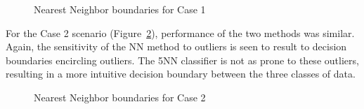 \documentclass[article, 1.5space, letterpaper, 12pt, oneside, header, footer]{SydeClass}
\begin{document}
\begin{figure}[ht]
\centering
	
	\caption{Nearest Neighbor boundaries for Case 1}
	\label{fig:nn_boundary_case1}
\end{figure}

For the Case 2 scenario (Figure~\ref{fig:nn_boundary_case2}), performance of the two methods was similar. Again, the sensitivity of the NN method to outliers is seen to result to decision boundaries encircling outliers. The 5NN classifier is not as prone to these outliers, resulting in a more intuitive decision boundary between the three classes of data.

\begin{figure}[ht]
\centering
	
	\caption{Nearest Neighbor boundaries for Case 2}
	\label{fig:nn_boundary_case2}
\end{figure}
\end{document}
